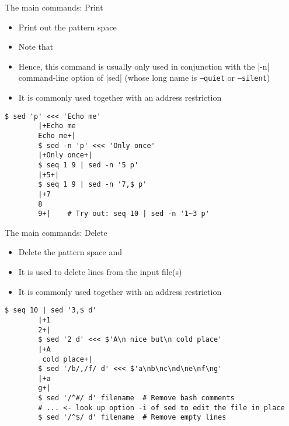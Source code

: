 \begin{frame}[fragile]{The main commands: Print}
    \vspace{-3mm}
    \begin{itemize}
        \item Print out the pattern space
        \item Note that 
        \item Hence, this command is usually only used in conjunction with the \bash|-n| command-line option of \bash|sed| (whose long name is \texttt{--quiet} or \texttt{--silent})
        \item It is commonly used together with an address restriction
    \end{itemize}
    \begin{lstlisting}[style=MyBash]
        $ sed 'p' <<< 'Echo me'
        |+Echo me
        Echo me+|
        $ sed -n 'p' <<< 'Only once'
        |+Only once+|
        $ seq 1 9 | sed -n '5 p'
        |+5+|
        $ seq 1 9 | sed -n '7,$ p'
        |+7
        8
        9+|    # Try out: seq 10 | sed -n '1~3 p'
    \end{lstlisting}
\end{frame}
\begin{frame}[fragile]{The main commands: Delete}
    \vspace{-3mm}
    \begin{itemize}
        \item Delete the pattern space and 
        \item It is used to delete lines from the input file(s)
        \item It is commonly used together with an address restriction
    \end{itemize}
    \medskip
    \begin{lstlisting}[style=MyBash]
        $ seq 10 | sed '3,$ d'
        |+1
        2+|
        $ sed '2 d' <<< $'A\n nice but\n cold place'
        |+A
         cold place+|
        $ sed '/b/,/f/ d' <<< $'a\nb\nc\nd\ne\nf\ng'
        |+a
        g+|
        $ sed '/^#/ d' filename  # Remove bash comments
        # ... <- look up option -i of sed to edit the file in place
        $ sed '/^$/ d' filename  # Remove empty lines
    \end{lstlisting}
\end{frame}
